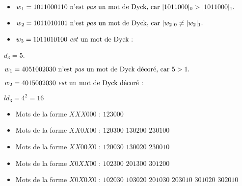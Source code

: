 \begin{example}[Définition 3 : $n = 5$]
    \begin{itemize}
        \item $w_1 = 1011000110 \text{ n'est \emph{pas} un mot de Dyck,
        car } |1011000|_0 > |1011000|_1.$
        \item $w_2 = 1011010101 \text{ n'est \emph{pas} un mot de Dyck,
        car } |w_2|_0 \neq |w_2|_1.$
        \item $w_3 = 1011010100 \text{ \emph{est} un mot de Dyck : }$
    \end{itemize}
    
\end{example}

\begin{example}[Théorème 3 : $n = 3$]
    $d_3 = 5$.
    \begin{center}
        
    \end{center}
\end{example}

\begin{example}[Définition 4 : $n = 5$]
    \begin{itemize*}
        \item $w_1 = 4051002030 \text{ n'est \emph{pas} un mot de Dyck
            décoré, car } 5 > 1.$
        \item $w_2 = 4015002030 \text{ \emph{est} un mot de Dyck décoré :}$
    \end{itemize*}
    
\end{example}

\begin{example}[Théorème 4 : $n = 3$]
    $ld_3 = 4^2 = 16$
    \begin{itemize}
        \item Mots de la forme $XXX000$ :
            \subitem $123000$
        \item Mots de la forme $XX0X00$ :
            \subitem $120300$
            \hspace{2cm} $130200$
            \hspace{2cm} $230100$
        \item Mots de la forme $XX00X0$ :
            \subitem $120030$
            \hspace{2cm} $130020$
            \hspace{2cm} $230010$
        \item Mots de la forme $X0XX00$ :
            \subitem $102300$
            \hspace{2cm} $201300$
            \hspace{2cm} $301200$
        \item Mots de la forme $X0X0X0$ :
            \subitem $102030$
            \hspace{2cm} $103020$
            \hspace{2cm} $201030$
            \subitem $203010$
            \hspace{2cm} $301020$
            \hspace{2cm} $302010$
    \end{itemize}
    
\end{example}